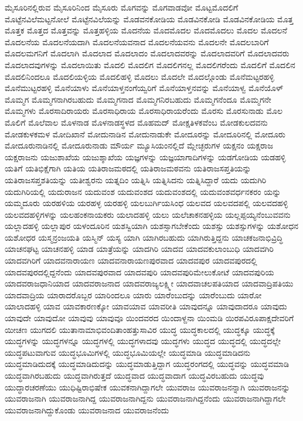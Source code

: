 {ಮೈಸೂರಿನಲ್ಲಿರುವ
ಮೈಸೂರಿನಿಂದ
ಮೈಸೂರು
ಮೊಗವನ್ನು
ಮೊಗವಾಡವೋ
ಮೊಟ್ಟಮೊದಲಿಗೆ
ಮೊಟ್ಟೆನವಿಲೆಮಟ್ಟನೋಲೆ
ಮೊಟ್ಟೆನವಿಲೆಯನ್ನು
ಮೊಡವನಕೋಡಿಯ
ಮೊಡವಿನಕೋಡಿ
ಮೊಡವಿನಕೋಡಿಯ
ಮೊತ್ತ
ಮೊತ್ತಕ
ಮೊತ್ತದ
ಮೊತ್ತವನ್ನು
ಮೊತ್ತಹಳ್ಳಿಯ
ಮೊದನೆಯ
ಮೊದಮೊದಲ
ಮೊದಮೊದಲು
ಮೊದಲ
ಮೊದಲನೆ
ಮೊದಲನೆಯ
ಮೊದಲನೆಯದಾಗಿ
ಮೊದಲನೆಯವನಾದ
ಮೊದಲನೆಯವನು
ಮೊದಲನೇ
ಮೊದಲಬಾರಿಗೆ
ಮೊದಲಮಗನಿಗೆ
ಮೊದಲಾಗಿ
ಮೊದಲಾದ
ಮೊದಲಾದಂ
ಮೊದಲಾದವರನ್ನು
ಮೊದಲಾದವರಿಗೆ
ಮೊದಲಾದವರು
ಮೊದಲಾದವುಗಳನ್ನು
ಮೊದಲಾಯಿತು
ಮೊದಲಿ
ಮೊದಲಿಗ
ಮೊದಲಿಗನಲ್ಲ
ಮೊದಲಿಗರೆಂದು
ಮೊದಲಿಗೆ
ಮೊದಲಿನ
ಮೊದಲಿನಿಂದಲೂ
ಮೊದಲಿಯಳ್ಳಿಯ
ಮೊದಲಿಹಳ್ಳಿ
ಮೊದಲು
ಮೊದಲೇ
ಮೊದಲ್ಗೊಂಡು
ಮೊನೆಮಟ್ಟರಹಳ್ಳಿ
ಮೊನೆಮುಟ್ಟರಹಳ್ಳಿ
ಮೊನೆಯಾಳು
ಮೊನೆಯಾಳ್ತನಂಗೆಯ್ವರಿಗೆ
ಮೊನೆಯಾಳ್ತನವನ್ನು
ಮೊನೆಯಾಳ್ವ
ಮೊನೆಯೊಳ್
ಮೊಮ್ಮಗ
ಮೊಮ್ಮಗನಾಗಿರಬಹುದು
ಮೊಮ್ಮಗನಾದ
ಮೊಮ್ಮಗನಿರಬಹುದು
ಮೊಮ್ಮಗನೆಂದೂ
ಮೊಮ್ಮಗನೇ
ಮೊಮ್ಮಗಳು
ಮೊರಸಾದಿರಾಯರು
ಮೊರಸಾಧಿರಾಯ
ಮೊರಸಾಧಿರಾಯರೆಂದು
ಮೊರಸು
ಮೊರಸುನಾಡು
ಮೊಲ
ಮೊಲಿಗೆ
ಮೊಲೆವಾಲ
ಮೊಳನಾಡ
ಮೊಳನಾಡಸ್ಥಳದ
ಮೊಹಮದ್
ಮೋಕ್ಷತಿಳಕವೆಂಬ
ಮೋಡಕುಲದವನು
ಮೋಡಕುಳಕಮಳ
ಮೋದಿಖಾನೆ
ಮೋದುನಾಡಿನ
ಮೋದುನಾಡುಕೇ
ಮೋದೂರನ್ನು
ಮೋದೂರಿನಲ್ಲಿ
ಮೋದೂರು
ಮೋದೂರುನಾಡಿನಲ್ಲಿ
ಮೋದೂರುನಾಡು
ಮೌರ್ಯ
ಮ್ಯೂಸಿಯಂನಲ್ಲಿದೆ
ಮ್ಲೇಚ್ಛರುಗಳ
ಯಕ್ಷನಂ
ಯಕ್ಷರಾಜ
ಯಕ್ಷರಾಜನು
ಯಜುಶಾಖೆಯ
ಯಜುಶ್ಶಾಖೆಯ
ಯಜ್ಞಗಳನ್ನು
ಯಜ್ಞಯಾಗಾದಿಗಳನ್ನು
ಯಡಗೋಡಿಯ
ಯಡಹಳ್ಳಿ
ಯತಿಗೆ
ಯತಿಭಿಕ್ಷೆಗಾಗಿ
ಯತಿಯ
ಯತಿರಾಜಮಠದಲ್ಲಿ
ಯತಿರಾಜಮಠವನು
ಯತಿರಾಜಸಪ್ತತಿಯನ್ನು
ಯತಿರಾಜಸಪ್ತಶತಿಯನ್ನು
ಯತೀಶ್ವರನು
ಯತ್ನದಿಂ
ಯತ್ನಿಸಿ
ಯತ್ನಿಸಿದನು
ಯತ್ನಿಸಿದ್ದಾರೆ
ಯದು
ಯದುಗಿರಿ
ಯದುಗಿರಿಯಲ್ಲಿ
ಯದುರಾಜನ
ಯದುವಂಶ
ಯದುವಂಶದ
ಯದುವಂಶದಲ್ಲಿ
ಯದುವಂಶವರ್ಧನಕರಂ
ಯನ್ನು
ಯಮ್ಮದೂರು
ಯರಹಳಿಯ
ಯರಹಳ್ಳ
ಯರಹಳ್ಳಿ
ಯಲಬುರ್ಗಿಯಸಿಂಧ
ಯಲವದ
ಯಲವದಪಲ್ಲಿ
ಯಲವದಹಳ್ಳಿ
ಯಲವದಹಳ್ಳಿಗಳನ್ನು
ಯಲಹಂಕನಾಯಕರು
ಯಲಾದಹಳ್ಳಿ
ಯಲು
ಯಲೆಚಾಕನಹಳ್ಳಿಯ
ಯಲ್ಲಪ್ಪಯ್ಯನೆಂಬುವವನು
ಯಲ್ಲಾದಹಳ್ಳಿ
ಯಲ್ಲಾಪುರ
ಯಳಂದೂರಿನ
ಯಶಸ್ವಿಯಾಗಿ
ಯಶಸ್ಸಾಗಬೇಕೆಂದು
ಯಶಸ್ಸು
ಯಶಸ್ಸುಗಳನ್ನು
ಯಶೋಧನ
ಯಶೋಧರ
ಯಸ್ಮನ್ರಂಜಯತಿ
ಯಸ್ಮಿನ್
ಯಸ್ಯ
ಯಾಗಿ
ಯಾಗಿರಬಹುದು
ಯಾಗಿರುತ್ತಿದ್ದನು
ಯಾಚಕಜನಾಭಿವ್ರಿದ್ಧಿ
ಯಾಚನಘಟ್ಟ
ಯಾಚನಹಳ್ಳಿ
ಯಾಡ
ಯಾತ್ರೆಯನ್ನು
ಯಾದಗಿರಿ
ಯಾದವ
ಯಾದವಕುಲಾಂಬುಧಿ
ಯಾದವಗಿರಿ
ಯಾದವಗಿರಿಗೆ
ಯಾದವನಾರಾಯಣ
ಯಾದವನಾರಾಯಣಪುರವಾದ
ಯಾದವಪುರ
ಯಾದವಪುರದಲ್ಲಿ
ಯಾದವಪುರದಲ್ಲಿದ್ದನೆಂದು
ಯಾದವಪುರವಾದ
ಯಾದವಪುರಿ
ಯಾದವಪುರಿಮೇಲುಕೋಟೆ
ಯಾದವಪುರಿಯ
ಯಾದವರಾಜಧಾನಿಯಾದ
ಯಾದವರಾಜನಾದ
ಯಾದವರಾಜ್ಯಲಕ್ಷ್ಮೀ
ಯಾದವಾಚಲಪತಿಯಾದ
ಯಾದವಾದ್ರಿಪತಿಯು
ಯಾದವಾದ್ರಿಯ
ಯಾರಾದರೊಬ್ಬರ
ಯಾರಿಂದಲೂ
ಯಾರು
ಯಾರೆಂಬುದನ್ನು
ಯಾರೆಂಬುದು
ಯಾರೋ
ಯಾಲಾದಹಳ್ಳಿ
ಯಾವ
ಯಾವಕಾರಣಕ್ಕೋ
ಯಾವಯಾವ
ಯಾವರೀತಿ
ಯಾವುದನ್ನೂ
ಯಾವುದಾದರೂ
ಯಾವುದು
ಯಾವುದೇ
ಯಾವುದೋ
ಯಾವುವು
ಯಾವುವೂ
ಯಿಂದವರದ
ಯಿಂದಾಳ್ದನಾ
ಯಿಂಮಡಿ
ಯಿರಪವಿರೂಪಾಕ್ಷದೇವರಿಗೆ
ಯೀಚಣ
ಯುಗದಲಿ
ಯುತಾನಾಮಾಭಿವಂದಿತಾಂಹತ್ತುಸಾವಿರ
ಯುದ್ಧ
ಯುದ್ಧಕಾಲದಲ್ಲಿ
ಯುದ್ಧಕ್ಕೂ
ಯುದ್ಧಕ್ಕೆ
ಯುದ್ಧಗಳನ್ನು
ಯುದ್ಧಗಳನ್ನೂ
ಯುದ್ಧಗಳಲ್ಲಿ
ಯುದ್ಧಗಳಾದವು
ಯುದ್ಧಗಳು
ಯುದ್ಧದ
ಯುದ್ಧದಲ್ಲಿ
ಯುದ್ಧದಲ್ಲೇ
ಯುದ್ಧಪಟುವಾಗುವ
ಯುದ್ಧಭೂಮಿಗಳಲ್ಲಿ
ಯುದ್ಧಭೂಮಿಯಲ್ಲೇ
ಯುದ್ಧಮಾಡಿ
ಯುದ್ಧಮಾಡಿದನು
ಯುದ್ಧಮಾಡಿದುದಕ್ಕೆ
ಯುದ್ಧಮಾಡಿದುದನ್ನು
ಯುದ್ಧಮಾಡುತ್ತಿದ್ದಾಗ
ಯುದ್ಧರಂಗದಲ್ಲಿ
ಯುದ್ಧವನ್ನು
ಯುದ್ಧವಮಾಡಿ
ಯುದ್ಧವಾಗಿರಬಹುದು
ಯುದ್ಧವಾಗಿರುತ್ತದೆ
ಯುದ್ಧವಾದ
ಯುದ್ಧವಾದಾಗ
ಯುದ್ಧವಿರಬಹುದು
ಯುದ್ಧವು
ಯುದ್ಧಾರಚರಣೆಯು
ಯುಧಿಷ್ಟಿರಾಭಿಷೇಕ
ಯುವಕನಾಗಿದ್ದಾಗಲೇ
ಯುವರಾಜ
ಯುವರಾಜನನ್ನಾಗಿ
ಯುವರಾಜನನ್ನು
ಯುವರಾಜನಾಗಿ
ಯುವರಾಜನಾಗಿದ್ದ
ಯುವರಾಜನಾಗಿದ್ದನು
ಯುವರಾಜನಾಗಿದ್ದನೆಂದು
ಯುವರಾಜನಾಗಿದ್ದಾಗಲೇ
ಯುವರಾಜನಾಗಿದ್ದುಕೊಂಡು
ಯುವರಾಜನಾದ
ಯುವರಾಜನೆಂದು
}

